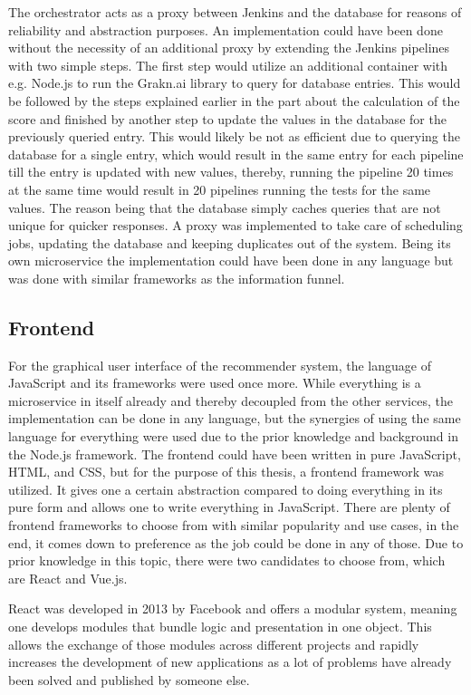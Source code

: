 The orchestrator acts as a proxy between Jenkins and the database for reasons of reliability and abstraction purposes.
An implementation could have been done without the necessity of an additional proxy by extending the Jenkins pipelines with two simple steps. The first step would utilize an additional container with e.g. Node.js to run the Grakn.ai library to query for database entries. This would be followed by the steps explained earlier in the part about the calculation of the score and finished by another step to update the values in the database for the previously queried entry. This would likely be not as efficient due to querying the database for a single entry, which would result in the same entry for each pipeline till the entry is updated with new values, thereby, running the pipeline 20 times at the same time would result in 20 pipelines running the tests for the same values. The reason being that the database simply caches queries that are not unique for quicker responses. A proxy was implemented to take care of scheduling jobs, updating the database and keeping duplicates out of the system. Being its own microservice the implementation could have been done in any language but was done with similar frameworks as the information funnel.
\subsection{Frontend}
For the graphical user interface of the recommender system, the language of JavaScript and its frameworks were used once more. While everything is a microservice in itself already and thereby decoupled from the other services, the implementation can be done in any language, but the synergies of using the same language for everything were used due to the prior knowledge and background in the Node.js framework.
The frontend could have been written in pure JavaScript, HTML, and CSS, but for the purpose of this thesis, a frontend framework was utilized. It gives one a certain abstraction compared to doing everything in its pure form and allows one to write everything in JavaScript. There are plenty of frontend frameworks to choose from with similar popularity and use cases, in the end, it comes down to preference as the job could be done in any of those. Due to prior knowledge in this topic, there were two candidates to choose from, which are React and Vue.js.

React was developed in 2013 by Facebook and offers a modular system, meaning one develops modules that bundle logic and presentation in one object. This allows the exchange of those modules across different projects and rapidly increases the development of new applications as a lot of problems have already been solved and published by someone else.


